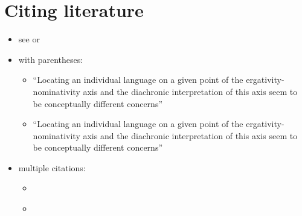 \documentclass{article}
\begin{document}
\section{\texorpdfstring{Citing literature
\label{sec:sources}}{Citing literature }}

\begin{itemize}
\tightlist
\item
  see \textcites{alvarez1998split} or
  \textcites[133-134]{alvarez1998split}
\item
  with parentheses:

  \begin{itemize}
  \tightlist
  \item
    ``Locating an individual language on a given point of the
    ergativity-nominativity axis and the diachronic interpretation of
    this axis seem to be conceptually different concerns''
    \parencites{alvarez1998split}
  \item
    ``Locating an individual language on a given point of the
    ergativity-nominativity axis and the diachronic interpretation of
    this axis seem to be conceptually different concerns''
    \parencites[71]{alvarez1998split}
  \end{itemize}
\item
  multiple citations:

  \begin{itemize}
  \tightlist
  \item
    \textcites[133-134]{alvarez1998split}[218]{triomeira1999}
  \item
    \parencites[133-134]{alvarez1998split}[218]{triomeira1999}
  \end{itemize}
\end{itemize}

\printbibliography
\end{document}
